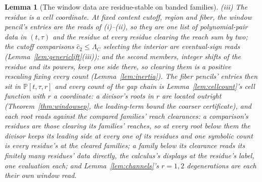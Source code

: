 \documentclass[11pt]{article}
\newtheorem{lemma}{Lemma}
\theoremstyle{definition}
\begin{document}
\begin{lemma}[The window data are residue-stable on banded families]
\emph{(iii) The residue is a cell coordinate.} At fixed content cutoff,
region and fiber, the window pencil's entries are the reads of (i)--(ii),
so they are one list of polynomial-pair data in $(t,\tau)$ and the
residue at every residue
clearing the reach sum by two; the
cutoff comparisons $\hat c_2\le\Lambda_C$ selecting the interior are
eventual-sign reads (Lemma~\ref{lem:genericlift}(iii)); and
the second members, integer shifts of the residue and its powers, keep one side there,
so clearing them is a positive rescaling fixing every count
(Lemma~\ref{lem:inertia}). The fiber pencils' entries
then sit in $\mathbb P[t,\tau,r]$ and every count of the gap chain is
Lemma~\ref{lem:cellcount}'s cell function with $r$ a coordinate: a
divisor's roots in $r$ are located outright
(Theorem~\ref{thm:windowsep}, the leading-term bound the coarser
certificate), and each root reads against the compared families'
reach clearances: a comparison's residues are those clearing its
families' reaches, so at every root below them
the divisor keeps its leading side at every one of its residues
and one symbolic count is every residue's at the
cleared families; a family below its clearance reads its finitely
many residues' data directly, the calculus's displays at the
residue's label, one evaluation each; and
Lemma~\ref{lem:channels}'s $r=1,2$
degenerations are each their own window read.

\end{lemma}
\end{document}
